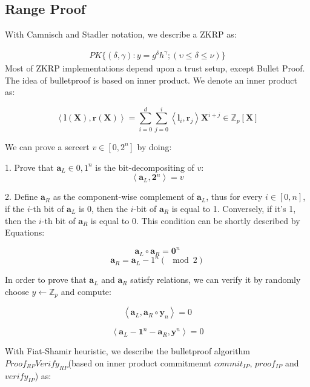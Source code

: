 \documentclass[UTF8]{article}
\newif\iflatextortf
\begin{document}
\clearpage
\iflatextortf
\else
\begin{appendices}
\fi

\section{Range Proof}
With Camnisch and Stadler notation\cite{crypto-1997-1045}, we describe a ZKRP as:

\begin{align*}
  PK\{(\delta, \gamma):y=g^{\delta}h^{\gamma}; (\upsilon \le \delta \le \nu)\}
\end{align*}
Most of ZKRP implementations depend upon a trust setup, except Bullet Proof\cite{bulletproof}. The idea of bulletproof is based on inner product. We denote an inner product as:

$$
\left< \mathbf{l(X)}, \mathbf{r(X)} \right> =\sum_{i=0}^d\sum_{j=0}^i
\left< \mathbf{l}_i, \mathbf{r}_j \right> \mathbf{X}^{i+j}\in \mathbb{Z}_p[\mathbf{X}]
$$

We can prove a sercert $v \in [0, 2^n]$ by doing:

1. Prove that $\mathbf{a}_L \in {0, 1}^n$ is the bit-decompositing of $v$:
$$
\left< \mathbf{a}_L, \mathbf{2}^n\right>=v
$$

2. Define $\mathbf{a}_R$ as the component-wise complement of $\mathbf{a}_L$, thus for every $i\in [0, n]$, if the $i$-th bit of $\mathbf{a}_L$ is 0, then the $i$-bit of $\mathbf{a}_R$ is equal to 1. Conversely, if it's 1, then the $i$-th bit of $\mathbf{a}_R$ is equal to 0. This condition can be shortly described by Equations:

$$
\mathbf{a}_L \circ \mathbf{a}_R = \mathbf{0}^n
$$
$$
\mathbf{a}_R =\mathbf{a}_L - 1^n (\mod 2)
$$

In order to prove that $\mathbf{a}_L$ and $\mathbf{a}_R$ satisfy relations, we can verify it by randomly choose $y \leftarrow \mathbb{Z}_p$ and compute:

$$
\left< \mathbf{a}_L, \mathbf{a}_R \circ \mathbf{y}_n \right> = 0
$$

$$
\left< \mathbf{a}_L - \mathbf{1}^n - \mathbf{a}_R, \mathbf{y}^n \right> = 0
$$

With Fiat-Shamir heuristic, we describe the bulletproof algorithm $Proof_{RP} Verify_{RP}$(based on inner product commitmennt $commit_{IP}$, $proof_{IP}$ and $verify_{IP}$) as:



\end{appendices}
\end{document}
